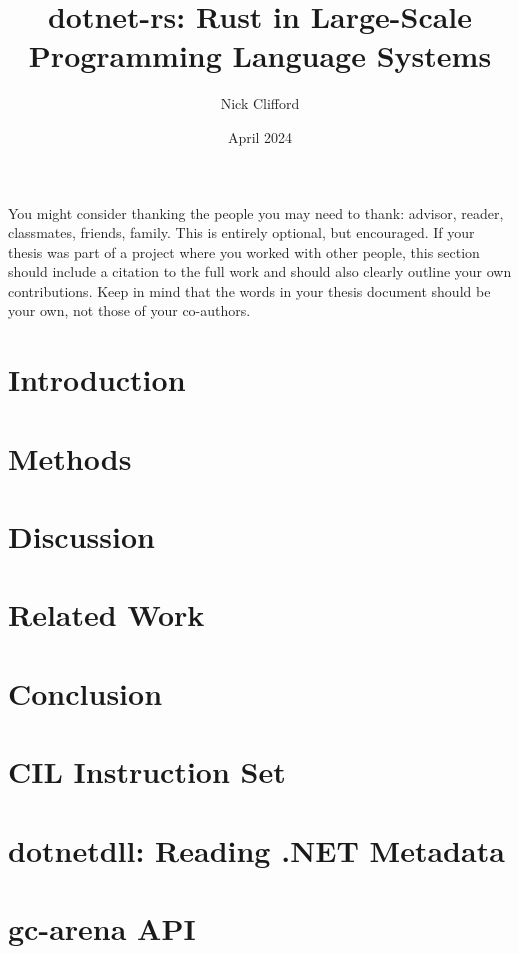\documentclass{ucetd}
\title{dotnet-rs: Rust in Large-Scale Programming Language Systems}
\author{Nick Clifford}
\date{April 2024}
\begin{document}
\maketitle

\makecopyright


\tableofcontents

\acknowledgments
You might consider thanking the people you may need to thank: advisor, reader, classmates, friends, family. This is entirely optional, but encouraged. If your thesis was part of a project where you worked with other people, this section should include a citation to the full work and should also clearly outline your own contributions. Keep in mind that the words in your thesis document should be your own, not those of your co-authors.

\abstract


\mainmatter

\chapter{Introduction}


\chapter{Methods}


\chapter{Discussion}


\chapter{Related Work}


\chapter{Conclusion}


\makebibliography

\appendix

\chapter{CIL Instruction Set}\label{app:cil}


\chapter{dotnetdll: Reading .NET Metadata}


\chapter{gc-arena API}


%
%
\end{document}
